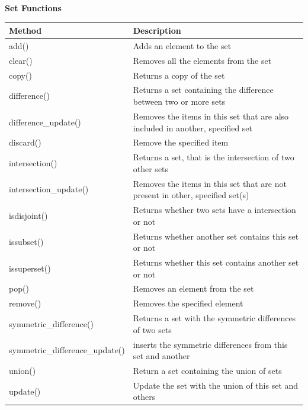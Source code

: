 \documentclass[UTF8]{article}
\begin{document}
\textbf{Set Functions}
\begin{table}
    \begin{tabular}{ll}
        \hline
        \textbf{Method} & \textbf{Description}    \\ \hline
        add()	&Adds an element to the set \\ \hline
        clear()&	Removes all the elements from the set \\ \hline
        copy()	&Returns a copy of the set \\ \hline
        difference()&	Returns a set containing the difference between two or more sets \\ \hline
        difference\_update()&	Removes the items in this set that are also included in another, specified set \\ \hline
        discard()	&Remove the specified item \\ \hline
        intersection()&Returns a set, that is the intersection of two other sets \\ \hline
        intersection\_update()	&Removes the items in this set that are not present in other, specified set(s) \\ \hline
        isdisjoint()&	Returns whether two sets have a intersection or not \\ \hline
        issubset()	&Returns whether another set contains this set or not \\ \hline
        issuperset()	&Returns whether this set contains another set or not \\ \hline
        pop()	&Removes an element from the set \\ \hline
        remove()&	Removes the specified element \\ \hline
        symmetric\_difference()&	Returns a set with the symmetric differences of two sets \\ \hline
        symmetric\_difference\_update()&	inserts the symmetric differences from this set and another \\ \hline
        union()&	Return a set containing the union of sets \\ \hline
        update()	&Update the set with the union of this set and others \\ \hline
    \end{tabular}
\end{table}
\end{document}
